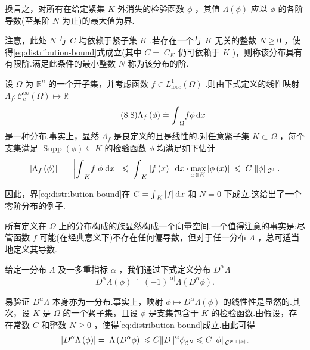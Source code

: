 换言之，对所有在给定紧集 $K$ 外消失的检验函数 $\phi$ ，其值 $\Lambda \left( \phi \right)$ 应以 $\phi$ 的各阶导数(至某阶 $N$ 为止)的最大值为界.

注意，此处 $N$ 与 $C$ 均依赖于紧子集 $K$ .若存在一个与 $K$ 无关的整数 $N \geq  0$ ，使得\eqref{eq:distribution-bound}式成立(其中 $C = \; {C}_{K}$ 仍可依赖于 $K$ )，则称该分布具有有限阶.满足此条件的最小整数 $N$ 称为该分布的阶.

\begin{instance}\label{ins:Lf-is-distribution}
设 $\Omega$ 为 ${\mathbb{R}}^{n}$ 的一个开子集，并考虑函数 $f \in  {L}_{\mathrm{{loc}}c}^{1}\left( \Omega \right)$ .则由下式定义的线性映射 ${\Lambda }_{f} : {\mathcal{C}}_{c}^{\infty }\left( \Omega \right)  \mapsto  \mathbb{R}$
\begin{equation}\tag{8.8}\label{eq:Lf-definition}
{\Lambda }_{f}\left( \phi \right)  \doteq  {\int }_{\Omega }{f\phi \mathop{}\!\mathrm{d} x}
\end{equation}
是一种分布.事实上，显然 ${\Lambda }_{f}$ 是良定义的且是线性的.对任意紧子集 $K \subset  \Omega$ ，每个支集满足 $\operatorname{Supp}\left( \phi \right)  \subseteq  K$ 的检验函数 $\phi$ 均满足如下估计
\[
\left| {{\Lambda }_{f}\left( \phi \right) }\right| \; = \;\left| {{\int }_{K}f\;\phi \;{\mathop{}\!\mathrm{d} x}}\right| \; \leqslant  \;{\int }_{K}\left| {f\left( x\right) }\right| \;{\mathop{}\!\mathrm{d} x} \cdot  \mathop{\max }\limits_{{x \in  K}}\left| {\phi \left( x\right) }\right| \; \leqslant  \;C\;\| \phi {\| }_{{\mathcal{C}}^{0}}\;.
\]

因此，界\eqref{eq:distribution-bound}在 $C = {\int }_{K}\left| f\right| {\mathop{}\!\mathrm{d} x}$ 和 $N = 0$ 下成立.这给出了一个零阶分布的例子.
\end{instance}

所有定义在 $\Omega$ 上的分布构成的族显然构成一个向量空间.一个值得注意的事实是:尽管函数 $f$ 可能(在经典意义下)不存在任何偏导数，但对于任一分布 $\Lambda$ ，总可适当地定义其导数.

\begin{definition}[分布的导数]\label{def:distribution-derivative}
给定一分布 $\Lambda$ 及一多重指标 $\alpha$ ，我们通过下式定义分布 ${D}^{\alpha }\Lambda$
\begin{equation}\tag{8.9}\label{eq:distribution-derivative}
{D}^{\alpha }\Lambda \left( \phi \right)  \doteq  {\left( -1\right) }^{\left| \alpha \right| }\Lambda \left( {{D}^{\alpha }\phi }\right) .
\end{equation}
\end{definition}

易验证 ${D}^{\alpha }\Lambda$ 本身亦为一分布.事实上，映射 $\phi  \mapsto  {D}^{\alpha }\Lambda \left( \phi \right)$ 的线性性是显然的.其次，设 $K$ 是 $\Omega$ 的一个紧子集，且设 $\phi$ 是支集包含于 $K$ 的检验函数.由假设，存在常数 $C$ 和整数 $N \geq  0$ ，使得\eqref{eq:distribution-bound}成立.由此可得
\[
\left| {{D}^{\alpha }\Lambda \left( \phi \right) }\right|  = \left| {\Lambda \left( {{D}^{\alpha }\phi }\right) }\right|  \leqslant  C{\norm{D}^{\alpha }\phi }_{{\mathcal{C}}^{N}} \leqslant  C\| \phi {\| }_{{\mathcal{C}}^{N + \left| \alpha \right| }}.
\]

